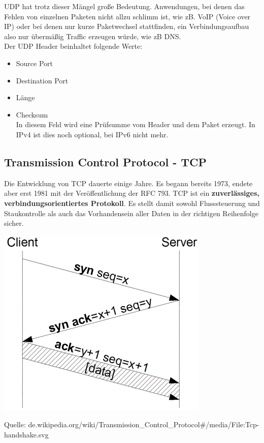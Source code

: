 \documentclass[12pt,a4paper]{report}
\begin{document}
\begin{onehalfspace}
UDP hat trotz dieser Mängel große Bedeutung. Anwendungen, bei denen das Fehlen von einzelnen Paketen nicht allzu schlimm ist, wie zB. VoIP (Voice over IP) oder bei denen nur kurze Paketwechsel stattfinden, ein Verbindungsaufbau also nur übermäßig Traffic erzeugen würde, wie zB DNS.\\

Der UDP Header beinhaltet folgende Werte: 
\begin{itemize}
\item Source Port
\item Destination Port
\item Länge
\item Checksum\\
In diesem Feld wird eine Prüfsumme vom Header und dem Paket erzeugt. In IPv4 ist dies noch optional, bei IPv6 nicht mehr.
\end{itemize}
\subsection{Transmission Control Protocol - TCP}
Die Entwicklung von TCP dauerte einige Jahre. Es begann bereits 1973, endete aber erst 1981 mit der Veröffentlichung der RFC 793. TCP ist ein \textbf{zuverlässiges, verbindungsorientiertes Protokoll}. Es stellt damit sowohl Flusssteuerung und Staukontrolle als auch das Vorhandensein aller Daten in der richtigen Reihenfolge sicher.\\

\begin{center}
\includegraphics[scale=0.6]{../docs/tarkes/pics/TcpHandshake.png}
\begin{scriptsize}
Quelle: de.wikipedia.org/wiki/Transmission\_Control\_Protocol\#/media/File:Tcp-handshake.svg
\end{scriptsize}
\end{center}


\end{onehalfspace}
\end{document}
